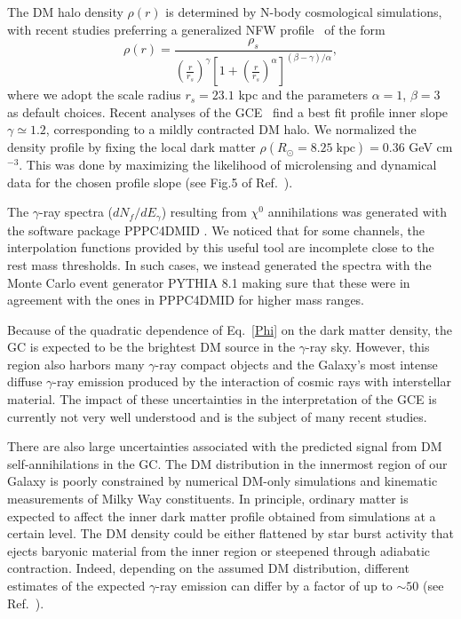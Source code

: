 The DM halo density $\rho(r)$ is determined by N-body cosmological simulations, with recent studies preferring a generalized NFW profile~\cite{navarrofrenkwhite1997} of the form
\begin{equation}
\rho(r)=\frac{\rho_s}{\left(\frac{r}{r_s}\right)^{\gamma}\left[1+\left(\frac{r}{r_s}\right)^{\alpha}\right]^{(\beta-\gamma)/\alpha}},
\label{nfw}
\end{equation}
where we adopt the scale radius $r_s=23.1$ kpc and the parameters $\alpha=1$, $\beta=3$ as default choices.
 Recent analyses of the GCE~\cite{GordonMacias2013,Daylan:2014,CaloreCholisWeniger2015} find a best fit profile inner slope $\gamma \simeq 1.2$, corresponding to a mildly contracted DM halo.
 We normalized the density profile by fixing the local dark matter $\rho(R_\odot=8.25\; \mbox{kpc})=0.36$ GeV cm$^{-3}$.
 This was done by maximizing the likelihood of microlensing and dynamical data for the chosen profile slope (see Fig.5 of Ref.~\cite{ioccopatobertone2011}). 

The $\gamma$-ray spectra ($dN_{f}/dE_{\gamma}$) resulting from $\chi^0$ annihilations was generated with the software package \textsc{PPPC4DMID} \cite{Cirelli_cookbook}.
 We noticed that for some channels, the interpolation functions provided by this useful tool are incomplete close to the rest mass thresholds.
 In such cases, we instead generated the spectra with the Monte Carlo event generator \textsc{PYTHIA 8.1} \cite{Sjostrand:2007gs} making sure that these were in agreement with the ones in \textsc{PPPC4DMID} for higher mass ranges.
 
Because of the quadratic dependence of Eq.~\ref{Phi} on the dark matter density, the GC is expected to be the brightest DM source in the $\gamma$-ray sky. However, this region also harbors many $\gamma$-ray compact objects and the Galaxy's most intense diffuse $\gamma$-ray emission produced by the interaction of cosmic rays with interstellar material. The impact of these uncertainties in the interpretation of the GCE is currently not very well understood and is the subject of many recent studies.

There are also large uncertainties associated with the predicted signal from DM self-annihilations in the GC. The DM distribution in the innermost region of our Galaxy is poorly constrained by numerical DM-only simulations and kinematic measurements of Milky Way constituents. In principle, ordinary matter is expected to affect the inner dark matter profile obtained from simulations at a certain level. The DM density could be either flattened by star burst activity that ejects baryonic material from the inner region or steepened through adiabatic contraction. Indeed, depending on the assumed DM distribution, different estimates of the expected $\gamma$-ray emission can differ by a factor of up to $\sim 50$ (see Ref.~\cite{Funk:review,Catena:2009mf}).

